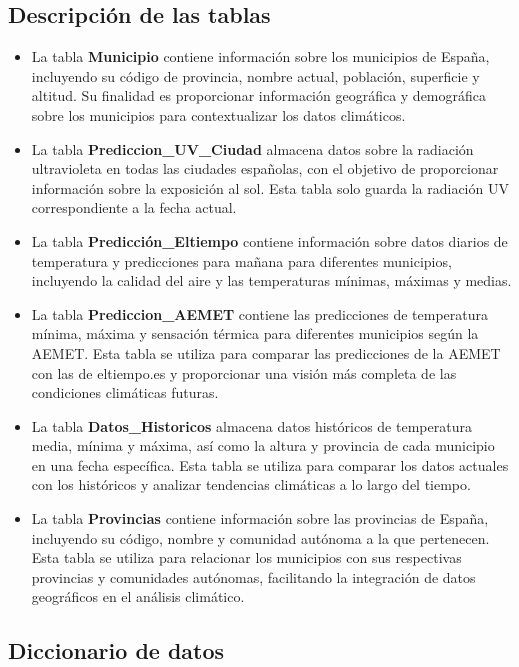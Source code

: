 \documentclass[12pt, a4paper]{article}
\begin{document}
\subsection{Descripción de las tablas}
\begin{itemize}
    \item La tabla \textbf{Municipio} contiene información sobre los municipios de España, incluyendo su código de provincia, nombre actual, población, superficie y altitud. Su finalidad es proporcionar información geográfica y demográfica sobre los municipios para contextualizar los datos climáticos.
    \item La tabla \textbf{Prediccion\_UV\_Ciudad} almacena datos sobre la radiación ultravioleta en todas las ciudades españolas, con el objetivo de proporcionar información sobre la exposición al sol. Esta tabla solo guarda la radiación UV correspondiente a la fecha actual.
    \item La tabla \textbf{Predicción\_Eltiempo} contiene información sobre datos diarios de temperatura y predicciones para mañana para diferentes municipios, incluyendo la calidad del aire y las temperaturas mínimas, máximas y medias.
    \item La tabla \textbf{Prediccion\_AEMET} contiene las predicciones de temperatura mínima, máxima y sensación térmica para diferentes municipios según la AEMET. Esta tabla se utiliza para comparar las predicciones de la AEMET con las de eltiempo.es y proporcionar una visión más completa de las condiciones climáticas futuras.
    \item La tabla \textbf{Datos\_Historicos} almacena datos históricos de temperatura media, mínima y máxima, así como la altura y provincia de cada municipio en una fecha específica. Esta tabla se utiliza para comparar los datos actuales con los históricos y analizar tendencias climáticas a lo largo del tiempo.
    \item La tabla \textbf{Provincias} contiene información sobre las provincias de España, incluyendo su código, nombre y comunidad autónoma a la que pertenecen. Esta tabla se utiliza para relacionar los municipios con sus respectivas provincias y comunidades autónomas, facilitando la integración de datos geográficos en el análisis climático.
\end{itemize}

\subsection{Diccionario de datos}
\end{document}
